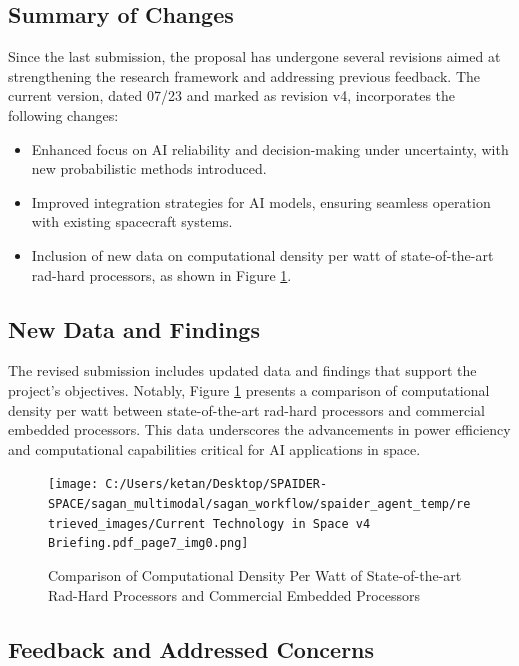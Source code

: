 \documentclass[a4paper, 11pt]{article}
\begin{document}
\subsection{Summary of Changes}

Since the last submission, the proposal has undergone several revisions aimed at strengthening the research framework and addressing previous feedback. The current version, dated 07/23 and marked as revision v4, incorporates the following changes:

\begin{itemize}
    \item Enhanced focus on AI reliability and decision-making under uncertainty, with new probabilistic methods introduced.
    \item Improved integration strategies for AI models, ensuring seamless operation with existing spacecraft systems.
    \item Inclusion of new data on computational density per watt of state-of-the-art rad-hard processors, as shown in Figure \ref{fig:comp-density}.
\end{itemize}

\subsection{New Data and Findings}

The revised submission includes updated data and findings that support the project's objectives. Notably, Figure \ref{fig:comp-density} presents a comparison of computational density per watt between state-of-the-art rad-hard processors and commercial embedded processors. This data underscores the advancements in power efficiency and computational capabilities critical for AI applications in space.

\begin{figure}[htbp]
    \centering
    \texttt{[image: C:/Users/ketan/Desktop/SPAIDER-SPACE/sagan\_multimodal/sagan\_workflow/spaider\_agent\_temp/retrieved\_images/Current Technology in Space v4 Briefing.pdf\_page7\_img0.png]}
    \caption{Comparison of Computational Density Per Watt of State-of-the-art Rad-Hard Processors and Commercial Embedded Processors}
    \label{fig:comp-density}
\end{figure}

\subsection{Feedback and Addressed Concerns}
\end{document}
